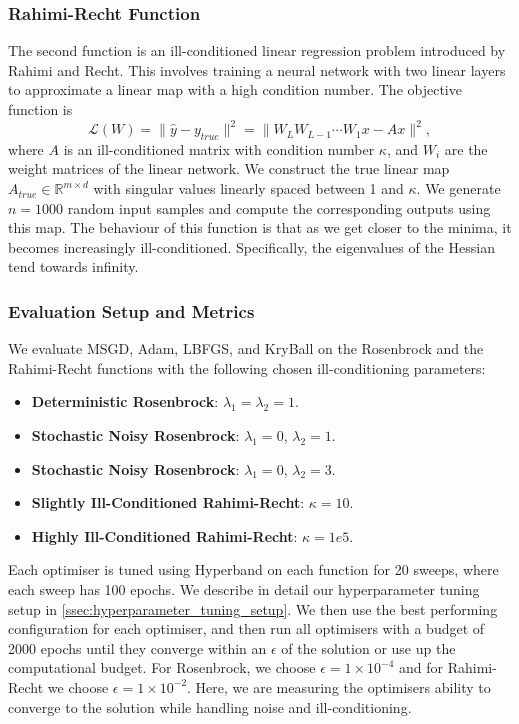\subsubsection{Rahimi-Recht Function}
\label{sssec:task_1_rahimi_recht_function}
The second function is an ill-conditioned linear regression problem introduced by Rahimi and Recht. This involves training a neural network with two linear layers to approximate a linear map with a high condition number. The objective function is
\begin{equation}
\mathcal{L}(W) = \|\hat{y} - y_{true}\|^2 = \|W_L W_{L-1} \cdots W_1 x - Ax\|^2, 
\end{equation}
where $A$ is an ill-conditioned matrix with condition number $\kappa$, and $W_i$ are the weight matrices of the linear network. We construct the true linear map $A_{true} \in \mathbb{R}^{m \times d}$ with singular values linearly spaced between 1 and $\kappa$. We generate $n=1000$ random input samples and compute the corresponding outputs using this map. The behaviour of this function is that as we get closer to the minima, it becomes increasingly ill-conditioned. Specifically, the eigenvalues of the Hessian tend towards infinity.

\subsubsection{Evaluation Setup and Metrics}
\label{sssec:task_1_evaluation_setup_and_metrics}
We evaluate MSGD, Adam, LBFGS, and KryBall on the Rosenbrock and the Rahimi-Recht functions with the following chosen ill-conditioning parameters:
\begin{itemize}
    \item \textbf{Deterministic Rosenbrock}: $\lambda_1 = \lambda_2 = 1$.
    \item \textbf{Stochastic Noisy Rosenbrock}: $\lambda_1 = 0$, $\lambda_2 = 1$.
    \item \textbf{Stochastic Noisy Rosenbrock}: $\lambda_1 = 0$, $\lambda_2 = 3$.
    \item \textbf{Slightly Ill-Conditioned Rahimi-Recht}: $\kappa = 10$.
    \item \textbf{Highly Ill-Conditioned Rahimi-Recht}: $\kappa = 1e5$.
\end{itemize}
Each optimiser is tuned using Hyperband on each function for 20 sweeps, where each sweep has 100 epochs. We describe in detail our hyperparameter tuning setup in \cref{ssec:hyperparameter_tuning_setup}. We then use the best performing configuration for each optimiser, and then run all optimisers with a budget of 2000 epochs until they converge within an $\epsilon$ of the solution or use up the computational budget. For Rosenbrock, we choose $\epsilon = 1 \times 10^{-4}$ and for Rahimi-Recht we choose $\epsilon = 1 \times 10^{-2}$. Here, we are measuring the optimisers ability to converge to the solution while handling noise and ill-conditioning.

